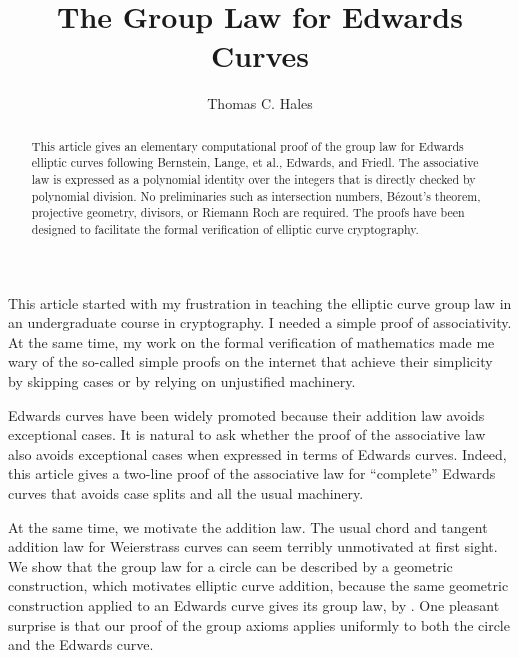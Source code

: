 \documentclass[12pt]{article}
\title{The Group Law for Edwards Curves}
\author{Thomas C. Hales}
\date{}
\begin{document}
\maketitle

\begin{abstract} 
  This article gives an elementary computational proof of the group
  law for Edwards elliptic curves following Bernstein, Lange, et al.,
  Edwards, and Friedl.  The associative law is expressed as a
  polynomial identity over the integers that is directly checked by
  polynomial division.  No preliminaries such as intersection numbers,
  B\'ezout's theorem, projective geometry, divisors, or Riemann Roch
  are required.  The proofs have been designed to facilitate the
  formal verification of elliptic curve cryptography.
\end{abstract}

\baselineskip
{}\baselineskip

\newenvironment{blockquote}{%
  \par%
  \medskip%
  \baselineskip=0.7\baselineskip%
  \leftskip=2em\rightskip=2em%
  \noindent\ignorespaces}{%
  \par\medskip}

This article started with my frustration in teaching the elliptic
curve group law in an undergraduate course in cryptography.  I needed
a simple proof of associativity.  At the same time, my work on the
formal verification of mathematics made me wary of the so-called
simple proofs on the internet that achieve their simplicity by
skipping cases or by relying on unjustified machinery.

Edwards curves have been widely promoted because their addition law
avoids exceptional cases.  It is natural to ask whether the proof of
the associative law also avoids exceptional cases when expressed in
terms of Edwards curves.  Indeed, this article gives a two-line proof
of the associative law for ``complete'' Edwards curves that avoids
case splits and all the usual machinery.

At the same time, we motivate the addition law.  The usual chord and
tangent addition law for Weierstrass curves can seem terribly
unmotivated at first sight.  We show that the group law for a circle
can be described by a geometric construction, which motivates elliptic
curve addition, because the same geometric construction applied to an
Edwards curve gives its group law, by \cite{arene2011faster}.  One
pleasant surprise is that our proof of the group axioms applies
uniformly to both the circle and the Edwards curve.
\end{document}
